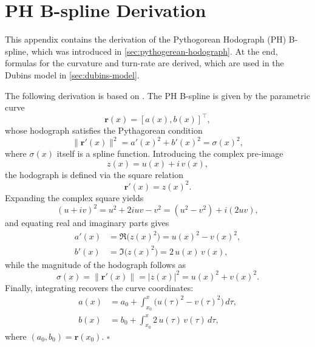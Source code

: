 

\chapter{PH B-spline Derivation}\label{app:ph-spline-derivation}
This appendix contains the derivation of the Pythogorean Hodograph (PH) B-spline, which was introduced in \cref{sec:pythogerean-hodograph}. At the end, formulas for the curvature and turn-rate are derived, which are used in the Dubins model in \cref{sec:dubins-model}.

The following derivation is based on \cite{Albrecht2016}.
The PH B-spline is given by the parametric curve
\begin{equation}\label{eq:ph-spline-curve}
    \mathbf r(x) = [a(x), b(x)]^\top,
\end{equation}
whose hodograph satisfies the Pythagorean condition
\begin{equation}\label{eq:ph-spline-hodograph}
    \|\mathbf r'(x)\|^2 = a'(x)^2 + b'(x)^2 = \sigma(x)^2,
\end{equation}
where $\sigma(x)$ itself is a spline function. 
Introducing the complex pre‐image
\begin{equation}
    z(x) = u(x) + i\,v(x),
\end{equation}
the hodograph is defined via the square relation
\begin{equation}\label{eq:hodograph-square}
    \mathbf r'(x) = z(x)^2.
\end{equation}
Expanding the complex square yields
\begin{equation}
    (u + i v)^2 = u^2 + 2iuv - v^2 = (u^2 - v^2) + i(2uv),
\end{equation}
and equating real and imaginary parts gives
\begin{subequations}\label{eq:hodograph-derivatives}
    \begin{align}
        a'(x) &= \Re\bigl(z(x)^2\bigr) = u(x)^2 - v(x)^2, \label{eq:hodograph-derivatives-a}\\
        b'(x) &= \Im\bigl(z(x)^2\bigr) = 2\,u(x)\,v(x), \label{eq:hodograph-derivatives-b}
    \end{align}
\end{subequations}
while the magnitude of the hodograph follows as
\begin{equation}
    \sigma(x) = \|\mathbf r'(x)\| = |z(x)|^2 = u(x)^2 + v(x)^2.
\end{equation}
Finally, integrating recovers the curve coordinates:
\begin{equation}
    \begin{aligned}
        a(x) &= a_0 + \int_{x_0}^{x}\bigl(u(\tau)^2 - v(\tau)^2\bigr)\,d\tau,\\
        b(x) &= b_0 + \int_{x_0}^{x}2\,u(\tau)\,v(\tau)\,d\tau,
    \end{aligned}
\end{equation}
where $(a_0,b_0)=\mathbf r(x_0)$. $\square$


